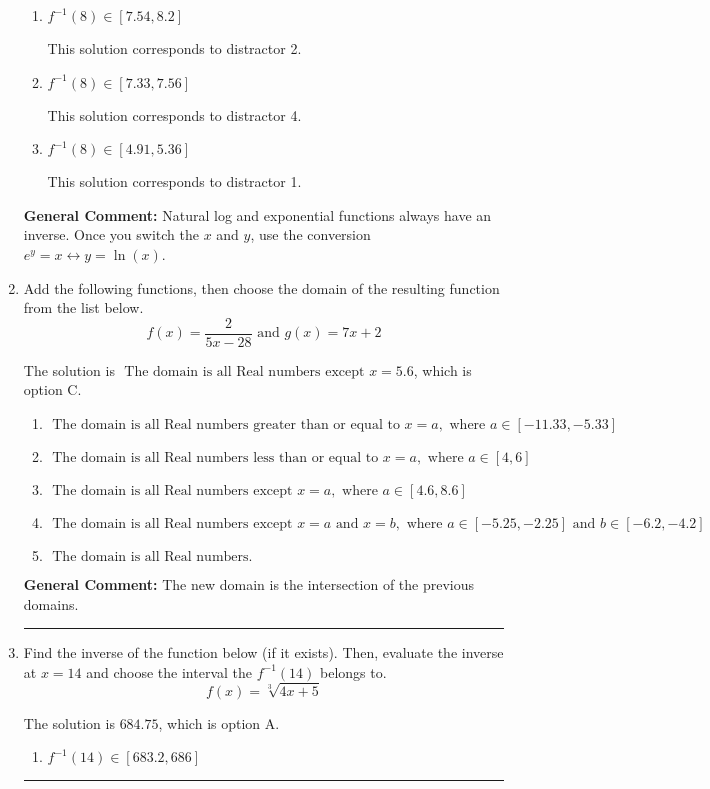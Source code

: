 \documentclass{extbook}[14pt]
\newcommand{\litem}[1]{\item #1

\rule{\textwidth}{0.4pt}}
\begin{document}
\begin{enumerate}
{\begin{enumerate}[label=\Alph*.]
 This solution corresponds to distractor 3.
\item \( f^{-1}(8) \in [7.54, 8.2] \)

 This solution corresponds to distractor 2.
\item \( f^{-1}(8) \in [7.33, 7.56] \)

 This solution corresponds to distractor 4.
\item \( f^{-1}(8) \in [4.91, 5.36] \)

 This solution corresponds to distractor 1.
\end{enumerate}

\textbf{General Comment:} Natural log and exponential functions always have an inverse. Once you switch the $x$ and $y$, use the conversion $ e^y = x \leftrightarrow y=\ln(x)$.
}
\litem{
Add the following functions, then choose the domain of the resulting function from the list below.
\[ f(x) = \frac{2}{5x-28} \text{ and } g(x) = 7x + 2 \]

The solution is \( \text{ The domain is all Real numbers except } x = 5.6 \), which is option C.\begin{enumerate}[label=\Alph*.]
\item \( \text{ The domain is all Real numbers greater than or equal to } x = a, \text{ where } a \in [-11.33, -5.33] \)


\item \( \text{ The domain is all Real numbers less than or equal to } x = a, \text{ where } a \in [4, 6] \)


\item \( \text{ The domain is all Real numbers except } x = a, \text{ where } a \in [4.6, 8.6] \)


\item \( \text{ The domain is all Real numbers except } x = a \text{ and } x = b, \text{ where } a \in [-5.25, -2.25] \text{ and } b \in [-6.2, -4.2] \)


\item \( \text{ The domain is all Real numbers. } \)


\end{enumerate}

\textbf{General Comment:} The new domain is the intersection of the previous domains.
}
\litem{
Find the inverse of the function below (if it exists). Then, evaluate the inverse at $x = 14$ and choose the interval the $f^{-1}(14)$ belongs to.
\[ f(x) = \sqrt[3]{4 x + 5} \]

The solution is \( 684.75 \), which is option A.\begin{enumerate}[label=\Alph*.]
\item \( f^{-1}(14) \in [683.2, 686] \)


\end{enumerate}}
\end{enumerate}
\end{document}
